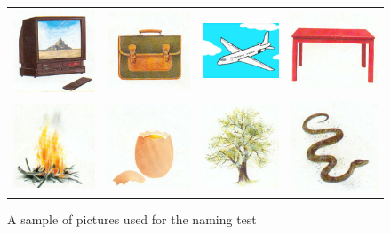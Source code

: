 \documentclass[output=paper,newtxmath,modfonts,nonflat,draftmode]{langsci/langscibook}
\begin{document}
\largerpage
\begin{figure}[H]
\caption{A sample of pictures used for the naming test}
\begin{tabularx}{\textwidth}{XXXX}
\includegraphics[width=.2\textwidth]{figures/takam-img1.png} & 
\includegraphics[width=.2\textwidth]{figures/takam-img2.png} & 
\includegraphics[width=.2\textwidth]{figures/takam-img3.png} & 
\includegraphics[width=.2\textwidth]{figures/takam-img4.png} \\
                       
\includegraphics[width=.2\textwidth]{figures/takam-img5.png} & 
\includegraphics[width=.2\textwidth]{figures/takam-img6.png} & 
\includegraphics[width=.2\textwidth]{figures/takam-img7.png} & 
\includegraphics[width=.2\textwidth]{figures/takam-img8.png} \\
                       

\end{tabularx}
\end{figure}
\end{document}
